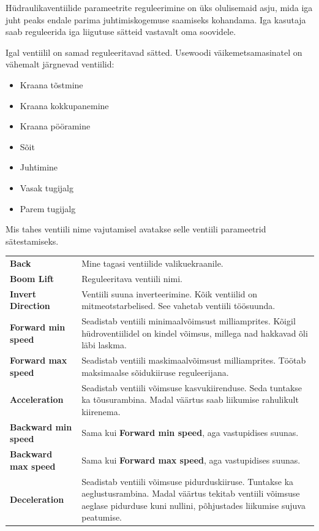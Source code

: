 \documentclass[12pt,a4paper,english]{uvmanual}
\begin{document}
Hüdraulikaventiilide parameetrite reguleerimine on üks olulisemaid asju, mida iga juht peaks endale parima juhtimiskogemuse saamiseks kohandama. Iga kasutaja saab reguleerida iga liigutuse sätteid vastavalt oma soovidele. 


Igal ventiilil on samad reguleeritavad sätted. Usewoodi väikemetsamasinatel on vähemalt järgnevad ventiilid:

\begin{itemize}
 \item Kraana tõstmine
 \item Kraana kokkupanemine
 \item Kraana pööramine
 \item Sõit
 \item Juhtimine
 \item Vasak tugijalg
 \item Parem tugijalg
\end{itemize}

Mis tahes ventiili nime vajutamisel avatakse selle ventiili parameetrid sätestamiseks.



\begin{tabular}{ L{0.2\textwidth} L{0.66\textwidth} }
\textbf{Back} & Mine tagasi ventiilide valikuekraanile.  \\
\textbf{Boom Lift} & Reguleeritava ventiili nimi.  \\
\textbf{Invert Direction} & Ventiili suuna inverteerimine. Kõik ventiilid on mitmeotstarbelised. See vahetab ventiili töösuunda.  \\
\textbf{Forward min speed} & Seadistab ventiili minimaalvõimsust milliamprites. Kõigil hüdroventiilidel on kindel võimsus, millega nad hakkavad õli läbi laskma.  \\
\textbf{Forward max speed} & Seadistab ventiili maskimaalvõimsust milliamprites. Töötab maksimaalse sõidukiiruse reguleerijana.  \\
\textbf{Acceleration} & Seadistab ventiili võimsuse kasvukiirenduse. Seda tuntakse ka tõusurambina. Madal väärtus saab liikumise rahulikult kiirenema.  \\
\textbf{Backward min speed} & Sama kui \textbf{Forward min speed}, aga vastupidises suunas.  \\
\textbf{Backward max speed} & Sama kui \textbf{Forward max speed}, aga vastupidises suunas.  \\
\textbf{Deceleration} & Seadistab ventiili võimsuse pidurduskiiruse. Tuntakse ka aeglustusrambina. Madal väärtus tekitab ventiili võimsuse aeglase pidurduse kuni nullini, põhjustades liikumise sujuva peatumise.  \\
\end{tabular}
\end{document}
